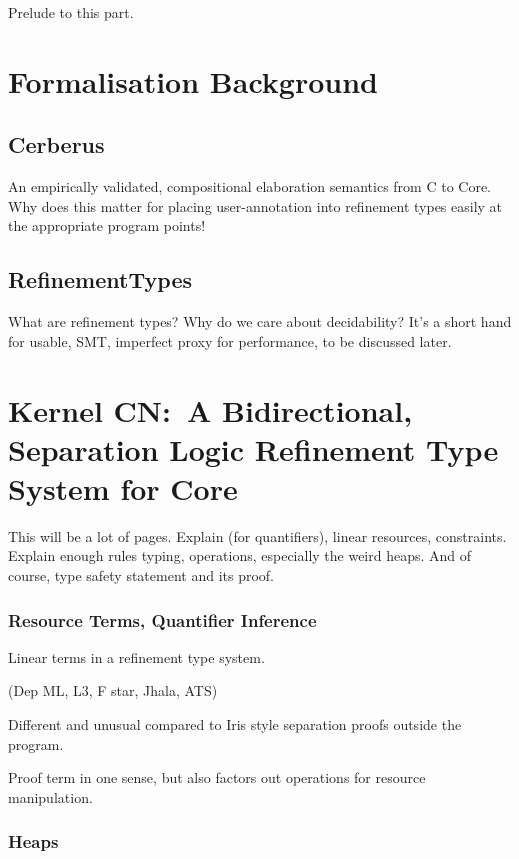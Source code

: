 Prelude to this part.

\chapter{Formalisation Background}%
\label{chap:formal-background}

\section{Cerberus}

An empirically validated, compositional elaboration semantics from C to Core.
Why does this matter \emdash{} for placing user-annotation into refinement types
easily at the appropriate program points!

\section{RefinementTypes}

What are refinement types? Why do we care about decidability? It's a short hand
for usable, SMT, imperfect proxy for performance, to be discussed later.

\chapter{Kernel CN:\ A Bidirectional, Separation Logic Refinement Type System for Core}%
\label{chap:kernel-cn}

This will be a lot of pages.
Explain  (for quantifiers), linear resources, constraints.
Explain enough rules \emdash{} typing, operations, especially the weird heaps.
And of course, type safety statement and its proof.

\subsection{Resource Terms, Quantifier Inference}

Linear terms in a refinement type system.

(Dep ML, L3, F star, Jhala, ATS)

Different and unusual compared to Iris style \emdash{} separation proofs outside the program.

Proof term in one sense, but also factors out operations for resource manipulation.

\subsection{Heaps}


